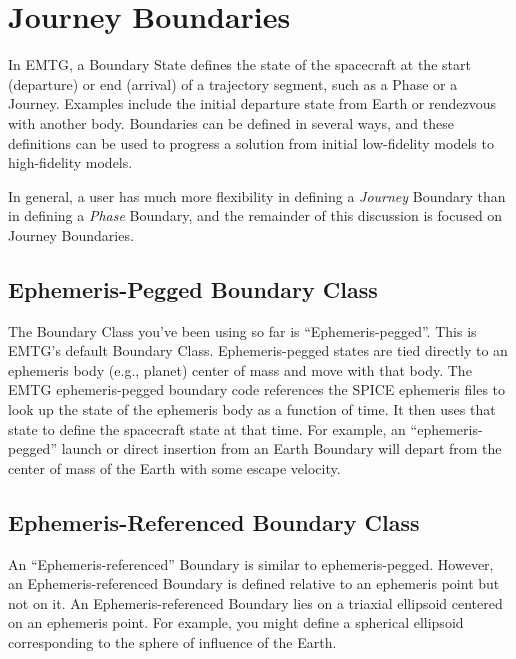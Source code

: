 \documentclass[11pt]{article}
\begin{document}
\section{Journey Boundaries}
\label{sec:journey_boundaries}

In \ac{EMTG}, a Boundary State defines the state of the spacecraft at the start (departure) or end (arrival) of a trajectory segment, such as a Phase or a Journey. Examples include the initial departure state from Earth or rendezvous with another body. Boundaries can be defined in several ways, and these definitions can be used to progress a solution from initial low-fidelity models to high-fidelity models.

\noindent In general, a user has much more flexibility in defining a \textit{Journey} Boundary than in defining a \textit{Phase} Boundary, and the remainder of this discussion is focused on Journey Boundaries.

\subsection{Ephemeris-Pegged Boundary Class}
\label{sec:ephemeris_pegged_boundary_class}

The Boundary Class you’ve been using so far is ``Ephemeris-pegged''. This is \ac{EMTG}’s default Boundary Class. Ephemeris-pegged states are tied directly to an ephemeris body (e.g., planet) center of mass and move with that body. The \ac{EMTG} ephemeris-pegged boundary code references the \acs{SPICE} ephemeris files to look up the state of the ephemeris body as a function of time. It then uses that state to define the spacecraft state at that time. For example, an ``ephemeris-pegged'' launch or direct insertion from an Earth Boundary will depart from the center of mass of the Earth with some escape velocity.

\subsection{Ephemeris-Referenced Boundary Class}
\label{sec:ephemeris_referenced_boundary_class}

An ``Ephemeris-referenced'' Boundary is similar to ephemeris-pegged. However, an Ephemeris-referenced Boundary is defined relative to an ephemeris point but not on it. An Ephemeris-referenced Boundary lies on a triaxial ellipsoid centered on an ephemeris point. For example, you might define a spherical ellipsoid corresponding to the sphere of influence of the Earth.
\end{document}
